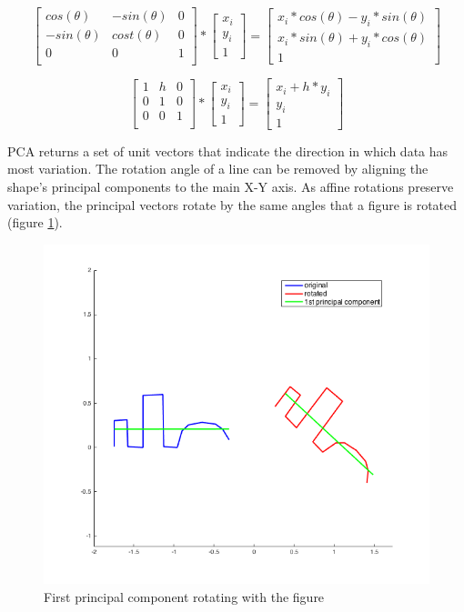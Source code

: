 \documentclass[11]{article}
\begin{document}
\begin{equation}
  \begin{bmatrix}
    cos(\theta)  & -sin(\theta) &   0 \\
    -sin(\theta) & cost(\theta) &   0 \\
      0      &  0       &   1 \\ 
  \end{bmatrix} 
  *
  \begin{bmatrix}
    x_i \\ y_i \\ 1
  \end{bmatrix} 
  = 
  \begin{bmatrix}
    x_i * cos(\theta) - y_i * sin(\theta) \\ x_i * sin(\theta) + y_i * cos(\theta) \\ 1
  \end{bmatrix} 
  \label{eq:rotate}
\end{equation}


\begin{equation}
  \begin{bmatrix}
    1 & h & 0 \\
    0 & 1 & 0 \\
    0 & 0 & 1   \\ 
  \end{bmatrix} 
  *
  \begin{bmatrix}
    x_i \\ y_i \\ 1
  \end{bmatrix} 
  = 
  \begin{bmatrix}
    x_i + h * y_i \\ y_i \\ 1  
  \end{bmatrix}
  \label{eq:shear}
\end{equation}

PCA returns a set of unit vectors that indicate the direction in which data has most variation. 
The rotation angle of a line can be removed by aligning the shape's principal components to the main X-Y axis.    
As affine rotations preserve variation, the principal vectors rotate by the same angles that a figure is rotated (figure \ref{fig:pca_rotation}).  

\begin{figure}[h]
  \centering
  \includegraphics[width=.5\textwidth]{figures/pca_rotation.png}
  \caption{First principal component rotating with the figure}
  \label{fig:pca_rotation}
\end{figure}  
\end{document}
